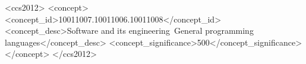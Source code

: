 \documentclass[acmsmall,review,anonymous]{acmart}\settopmatter{printfolios=true}
\begin{document}
\begin{abstract}
%
%
%
%
%
\end{abstract}



\begin{CCSXML}
<ccs2012>
<concept>
<concept_id>10011007.10011006.10011008</concept_id>
<concept_desc>Software and its engineering~General programming languages</concept_desc>
<concept_significance>500</concept_significance>
</concept>
</ccs2012>
\end{CCSXML}



\end{document}
